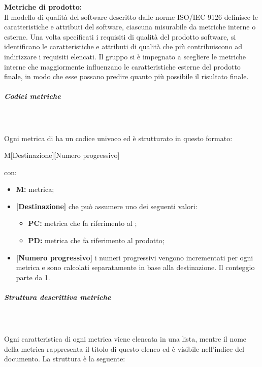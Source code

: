 \textbf{Metriche di prodotto:}\\
Il modello di qualità del software descritto dalle norme ISO/IEC 9126 definisce le caratteristiche e attributi del software, ciascuna misurabile da metriche interne o esterne.
Una volta specificati i requisiti di qualità del prodotto software, si identificano le caratteristiche e attributi di qualità che più contribuiscono ad indirizzare i requisiti elencati.
Il gruppo \Gruppo{} si è impegnato a scegliere le metriche interne che maggiormente influenzano le caratteristiche esterne del prodotto finale, in modo che esse possano predire quanto più possibile il risultato finale.

\subparagraph{Codici metriche}\mbox{}\\ \\
Ogni metrica di  ha un codice univoco ed è strutturato in questo formato:
\begin{center}
    M[Destinazione][Numero progressivo]
\end{center}
con:
\begin{itemize}  
\item \textbf{M:} metrica;
\item \textbf{[Destinazione]} che può assumere uno dei seguenti valori:
    \begin{itemize}
        \item \textbf{PC:} metrica che fa riferimento al ;
        \item \textbf{PD:} metrica che fa riferimento al prodotto;
    \end{itemize}
    \item \textbf{[Numero progressivo]} i numeri progressivi vengono incrementati per ogni metrica e sono calcolati separatamente in base alla destinazione. Il conteggio parte da 1.
 \end{itemize}
\subparagraph{Struttura descrittiva metriche}\mbox{}\\ \\
Ogni caratteristica di ogni metrica viene elencata in una lista, mentre il nome della metrica rappresenta il titolo di questo elenco ed è visibile nell'indice del documento. La struttura è la seguente:
